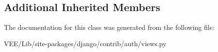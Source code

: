 \subsection*{Additional Inherited Members}


The documentation for this class was generated from the following file\+:\begin{DoxyCompactItemize}
\item 
V\+E\+E/\+Lib/site-\/packages/django/contrib/auth/views.\+py\end{DoxyCompactItemize}
